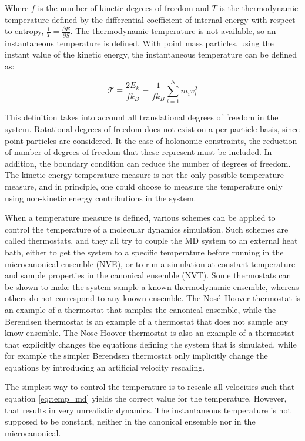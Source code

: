 Where $f$ is the number of kinetic degrees of freedom and $T$ is the thermodynamic temperature defined by the differential coefficient of internal energy with respect to entropy, $\frac{1}{T} = \frac{\partial E}{\partial S}$. The thermodynamic temperature is not available, so an instantaneous temperature is defined. With point mass particles, using the instant value of the kinetic energy, the instantaneous temperature can be defined as:

\begin{equation}
	\mathcal{T} \equiv \frac{2E_k}{f k_B} = \frac{1}{f k_B}\sum_{i=1}^{N} m_iv_i^2
	\label{eq:temp_md}
\end{equation}

This definition takes into account all translational degrees of freedom in the system. Rotational degrees of freedom does not exist on a per-particle basis, since point particles are considered. It the case of holonomic constraints, the reduction of number of degrees of freedom that these represent must be included. In addition, the boundary condition can reduce the number of degrees of freedom. The kinetic energy temperature measure is not the only possible temperature measure, and in principle, one could choose to measure the temperature only using non-kinetic energy contributions in the system. 

When a temperature measure is defined, various schemes can be applied to control the temperature of a molecular dynamics simulation. Such schemes are called thermostats, and they all try to couple the MD system to an external heat bath, either to get the system to a specific temperature before running in the microcanonical ensemble (NVE), or to run a simulation at constant temperature and sample properties in the canonical ensemble (NVT). Some thermostats can be shown to make the system sample a known thermodynamic ensemble, whereas others do not correspond to any known ensemble. The Nosé--Hoover thermostat is an example of a thermostat that samples the canonical ensemble, while the Berendsen thermostat is an example of a thermostat that does not sample any know ensemble. The Nose-Hoover thermostat is also an example of a thermostat that explicitly changes the equations defining the system that is simulated, while for example the simpler Berendsen thermostat only implicitly change the equations by introducing an artificial velocity rescaling. 

The simplest way to control the temperature is to rescale all velocities such that equation \ref{eq:temp_md} yields the correct value for the temperature. However, that results in very unrealistic dynamics. The instantaneous temperature is not supposed to be constant, neither in the canonical ensemble nor in the microcanonical. 

